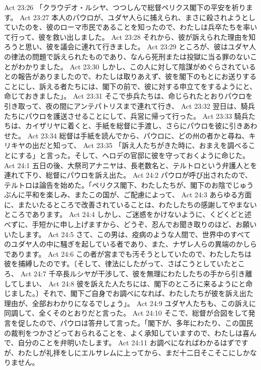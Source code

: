 Act 23:26  「クラウデオ・ルシヤ、つつしんで総督ペリクス閣下の平安を祈ります。
Act 23:27  本人のパウロが、ユダヤ人らに捕えられ、まさに殺されようとしていたのを、彼のローマ市民であることを知ったので、わたしは兵卒たちを率いて行って、彼を救い出しました。
Act 23:28  それから、彼が訴えられた理由を知ろうと思い、彼を議会に連れて行きました。
Act 23:29  ところが、彼はユダヤ人の律法の問題で訴えられたものであり、なんら死刑または投獄に当る罪のないことがわかりました。
Act 23:30  しかし、この人に対して陰謀がめぐらされているとの報告がありましたので、わたしは取りあえず、彼を閣下のもとにお送りすることにし、訴える者たちには、閣下の前で、彼に対する申立てをするようにと、命じておきました」。
Act 23:31  そこで歩兵たちは、命じられたとおりパウロを引き取って、夜の間にアンテパトリスまで連れて行き、
Act 23:32  翌日は、騎兵たちにパウロを護送させることにして、兵営に帰って行った。
Act 23:33  騎兵たちは、カイザリヤに着くと、手紙を総督に手渡し、さらにパウロを彼に引きあわせた。
Act 23:34  総督は手紙を読んでから、パウロに、どの州の者かと尋ね、キリキヤの出だと知って、
Act 23:35  「訴え人たちがきた時に、おまえを調べることにする」と言った。そして、ヘロデの官邸に彼を守っておくように命じた。
Act 24:1  五日の後、大祭司アナニヤは、長老数名と、テルトロという弁護人とを連れて下り、総督にパウロを訴え出た。
Act 24:2  パウロが呼び出されたので、テルトロは論告を始めた。「ペリクス閣下、わたしたちが、閣下のお陰でじゅうぶんに平和を楽しみ、またこの国が、ご配慮によって、
Act 24:3  あらゆる方面に、またいたるところで改善されていることは、わたしたちの感謝してやまないところであります。
Act 24:4  しかし、ご迷惑をかけないように、くどくどと述べずに、手短かに申し上げますから、どうぞ、忍んでお聞き取りのほど、お願いいたします。
Act 24:5  さて、この男は、疫病のような人間で、世界中のすべてのユダヤ人の中に騒ぎを起している者であり、また、ナザレ人らの異端のかしらであります。
Act 24:6  この者が宮までも汚そうとしていたので、わたしたちは彼を捕縛したのです。〔そして、律法にしたがって、さばこうとしていたところ、
Act 24:7  千卒長ルシヤが干渉して、彼を無理にわたしたちの手から引き離してしまい、
Act 24:8  彼を訴えた人たちには、閣下のところに来るようにと命じました。〕それで、閣下ご自身でお調べになれば、わたしたちが彼を訴え出た理由が、全部おわかりになるでしょう」。
Act 24:9  ユダヤ人たちも、この訴えに同調して、全くそのとおりだと言った。
Act 24:10  そこで、総督が合図をして発言を促したので、パウロは答弁して言った。「閣下が、多年にわたり、この国民の裁判をつかさどっておられることを、よく承知していますので、わたしは喜んで、自分のことを弁明いたします。
Act 24:11  お調べになればわかるはずですが、わたしが礼拝をしにエルサレムに上ってから、まだ十二日そこそこにしかなりません。
